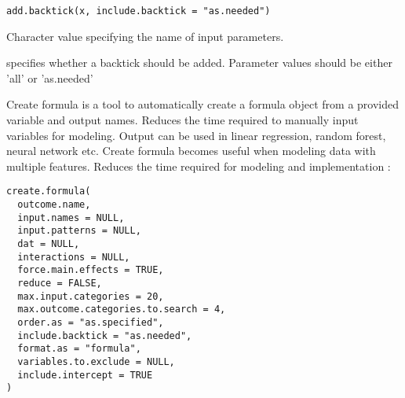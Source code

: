 \documentclass[a4paper]{book}
\begin{document}
%
\begin{Usage}
\begin{verbatim}
add.backtick(x, include.backtick = "as.needed")
\end{verbatim}
\end{Usage}
%
\begin{Arguments}
\begin{ldescription}
\item[\code{x}] Character value specifying the name of input parameters.

\item[\code{include.backtick}] specifies whether a backtick should be added.
Parameter values should be either 'all' or 'as.needed'
\end{ldescription}
\end{Arguments}
%
\begin{Description}\relax
Create formula is a tool to automatically create a formula object from a
provided variable and output names. Reduces the time required to manually
input variables for modeling. Output can be used in linear regression,
random forest, neural network etc. Create formula becomes useful when
modeling data with multiple features. Reduces the time required for modeling
and implementation :
\end{Description}
%
\begin{Usage}
\begin{verbatim}
create.formula(
  outcome.name,
  input.names = NULL,
  input.patterns = NULL,
  dat = NULL,
  interactions = NULL,
  force.main.effects = TRUE,
  reduce = FALSE,
  max.input.categories = 20,
  max.outcome.categories.to.search = 4,
  order.as = "as.specified",
  include.backtick = "as.needed",
  format.as = "formula",
  variables.to.exclude = NULL,
  include.intercept = TRUE
)
\end{verbatim}
\end{Usage}
%
\end{document}
